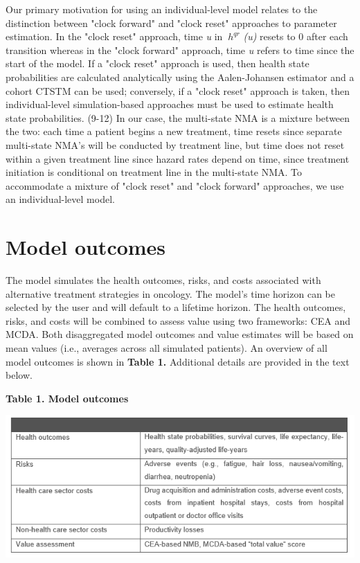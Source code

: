 \documentclass[11pt,final,fleqn]{article}\usepackage[]{graphicx}\usepackage[]{color}
\theoremstyle{plain}
\begin{document}
{Our primary motivation for using an individual-level model relates to the distinction between "clock forward" and "clock reset" approaches to parameter estimation. In the "clock reset" approach, time \textit{u} in $\ h^{qr} $ \textit{(u)} resets to 0 after each transition whereas in the "clock forward" approach, time \textit{u} refers to time since the start of the model. If a "clock reset" approach is used, then health state probabilities are calculated analytically using the Aalen-Johansen estimator and a cohort CTSTM can be used; conversely, if a "clock reset" approach is taken, then individual-level simulation-based approaches must be used to estimate health state probabilities. (9-12) In our case, the multi-state NMA is a mixture between the two: each time a patient begins a new treatment, time resets since separate multi-state NMA's will be conducted by treatment line, but time does not reset within a given treatment line since hazard rates depend on time, since treatment initiation is conditional on treatment line in the multi-state NMA. To accommodate a mixture of "clock reset" and "clock forward" approaches, we use an individual-level model. 

\section{Model outcomes}\label{sec:model-outcomes}

The model simulates the health outcomes, risks, and costs associated with alternative treatment strategies in oncology. The model's time horizon can be selected by the user and will default to a lifetime horizon. The health outcomes, risks, and costs will be combined to assess value using two frameworks: CEA and MCDA. Both disaggregated model outcomes and value estimates will be based on mean values (i.e., averages across all simulated patients). An overview of all model outcomes is shown in \textbf{Table 1.} Additional details are provided in the text below.  

\textbf{Table 1. Model outcomes} 

\includegraphics[scale=1]{Table 1.PNG} 

}
\end{document}
